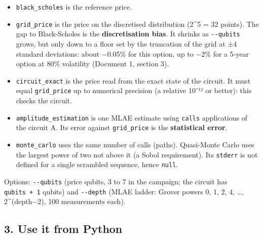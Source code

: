 \documentclass[
  10pt,
]{article}
\providecommand{\tightlist}{%
  \setlength{\itemsep}{0pt}\setlength{\parskip}{0pt}}
\begin{document}
\begin{itemize}
\tightlist
\item
  \texttt{black\_scholes} is the reference price.
\item
  \texttt{grid\_price} is the price on the discretised distribution
  (2\^{}5 = 32 points). The gap to Black-Scholes is the
  \textbf{discretisation bias}. It shrinks as \texttt{-\/-qubits} grows,
  but only down to a floor set by the truncation of the grid at ±4
  standard deviations: about −0.05\% for this option, up to −2\% for a
  5-year option at 80\% volatility (Document 1, section 3).
\item
  \texttt{circuit\_exact} is the price read from the exact state of the
  circuit. It must equal \texttt{grid\_price} up to numerical precision
  (a relative 10⁻¹² or better): this checks the circuit.
\item
  \texttt{amplitude\_estimation} is one MLAE estimate using
  \texttt{calls} applications of the circuit A. Its error against
  \texttt{grid\_price} is the \textbf{statistical error}.
\item
  \texttt{monte\_carlo} uses the same number of calls (paths).
  Quasi-Monte Carlo uses the largest power of two not above it (a Sobol
  requirement). Its \texttt{stderr} is not defined for a single
  scrambled sequence, hence \texttt{null}.
\end{itemize}

Options: \texttt{-\/-qubits} (price qubits, 3 to 7 in the campaign; the
circuit has \texttt{qubits\ +\ 1} qubits) and \texttt{-\/-depth} (MLAE
ladder: Grover powers 0, 1, 2, 4, \ldots, 2\^{}(depth−2), 100
measurements each).

\hypertarget{3-use-it-from-python}{%
\subsection{3. Use it from Python}\label{3-use-it-from-python}}
\end{document}
